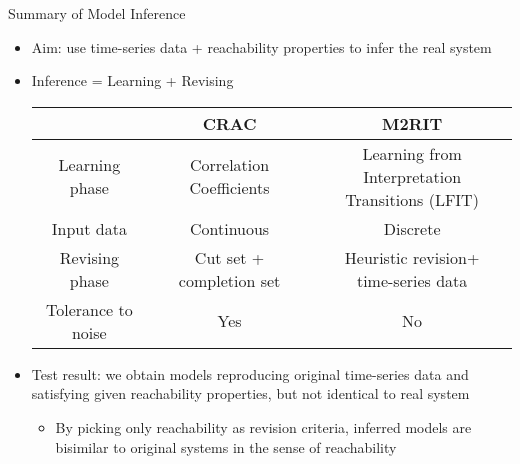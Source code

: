 \documentclass[8pt]{beamer}
\begin{document}
\begin{frame}{Summary of Model Inference}    
\begin{itemize}
\item Aim: use time-series data + reachability properties to infer the real system
\pause
\item Inference = Learning + Revising
\pause
\begin{tabular}{c|c|c}
    &CRAC & M2RIT \\
    \hline
    Learning phase & Correlation Coefficients & \makecell{Learning from Interpretation\\ Transitions (LFIT)}
    \pause\\
    \hline
    Input data &Continuous & Discrete
    \pause\\
    \hline
    Revising phase & \makecell{Cut set +\\ completion set} & \makecell{Heuristic revision+\\time-series data}
    \pause\\
    \hline
    \makecell{Tolerance to\\ noise}&Yes&No
\end{tabular}
\pause
\item Test result: we obtain models reproducing original time-series data and satisfying given reachability properties, but not identical to real system
\pause
\begin{itemize}
    \item By picking only reachability as revision criteria, inferred models are bisimilar to original systems in the sense of reachability
\end{itemize}
\end{itemize}
\end{frame}
\end{document}
